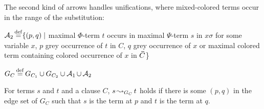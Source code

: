 \documentclass[,%
	draft=false,%
	numbers=noendperiod
	11pt,
	a4paper,
	oneside,%
	openany,
]{memoir}
\begin{document}
\begin{defi}
\begin{itemize}
			The second kind of arrows handles unifications, where mixed-colored terms occur in the range of the substitution:

			$\operatorname{\mathcal{A}}_2 \operatorname{\stackrel{\mathrm{def}}{=}} \{ (p, q) \mid $ maximal $\Phi$-term $t$ occurs in maximal $\Psi$-term $s$ in $x\sigma$ for some variable $x$, $p$ grey occurrence of $t$ in $C$, $q$ grey occurrence of $x$ or maximal colored term containing colored occurrence of $x$ in $\bm\bar C$\}


			$G_C \operatorname{\stackrel{\mathrm{def}}{=}} G_{C_1} \cup G_{C_2} \cup \operatorname{\mathcal{A}}_1 \cup \operatorname{\mathcal{A}}_2$
			\qedhere




	\end{itemize}
\end{defi}




\begin{defi}[$\apath$]
	For terms $s$ and $t$ and a clause $C$, $s\operatorname{\leadsto}_{G_C} t$ holds if there is some $(p, q)$ in the edge set of $G_C$ such that $s$ is the term at $p$ and $t$ is the term at $q$.
\end{defi}
\end{document}
